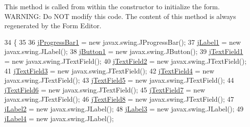 This method is called from within the constructor to initialize the form. W\+A\+R\+N\+I\+NG\+: Do N\+OT modify this code. The content of this method is always regenerated by the Form Editor. 
\begin{DoxyCode}
34                                   \{
35 
36         \mbox{\hyperlink{class_interfaz_package_1_1_alta_diccionario_a708a5b8c6cc94306cd57109ba082a3af}{jProgressBar1}} = \textcolor{keyword}{new} javax.swing.JProgressBar();
37         \mbox{\hyperlink{class_interfaz_package_1_1_alta_diccionario_af8a39de35277501b7801eaf2c5ccbf33}{jLabel1}} = \textcolor{keyword}{new} javax.swing.JLabel();
38         \mbox{\hyperlink{class_interfaz_package_1_1_alta_diccionario_a0f3026ebbc0c7a84616c54c8279221e6}{jButton1}} = \textcolor{keyword}{new} javax.swing.JButton();
39         \mbox{\hyperlink{class_interfaz_package_1_1_alta_diccionario_a36c60a7c341675a6d9588408d4babd4c}{jTextField1}} = \textcolor{keyword}{new} javax.swing.JTextField();
40         \mbox{\hyperlink{class_interfaz_package_1_1_alta_diccionario_ad64c1145064a7b09a9bc29cf43974b70}{jTextField2}} = \textcolor{keyword}{new} javax.swing.JTextField();
41         \mbox{\hyperlink{class_interfaz_package_1_1_alta_diccionario_aae93f196d81a8be5120cd2e4a3968176}{jTextField3}} = \textcolor{keyword}{new} javax.swing.JTextField();
42         \mbox{\hyperlink{class_interfaz_package_1_1_alta_diccionario_a66e68fc19055b7af4fcac12091ab7c45}{jTextField4}} = \textcolor{keyword}{new} javax.swing.JTextField();
43         \mbox{\hyperlink{class_interfaz_package_1_1_alta_diccionario_a56756a5f37a4a3056ce24d5570b99d61}{jTextField5}} = \textcolor{keyword}{new} javax.swing.JTextField();
44         \mbox{\hyperlink{class_interfaz_package_1_1_alta_diccionario_af4d8c6da79f9c1a9c5d4d8b9f70935c0}{jTextField6}} = \textcolor{keyword}{new} javax.swing.JTextField();
45         \mbox{\hyperlink{class_interfaz_package_1_1_alta_diccionario_a21d52c5fe53e1a05874c6771dc828a1d}{jTextField7}} = \textcolor{keyword}{new} javax.swing.JTextField();
46         \mbox{\hyperlink{class_interfaz_package_1_1_alta_diccionario_a3e91b2eb94fa14f68ad137f48e0500f6}{jTextField8}} = \textcolor{keyword}{new} javax.swing.JTextField();
47         \mbox{\hyperlink{class_interfaz_package_1_1_alta_diccionario_ab2913168b8ce8c2e33af1a06a91424a1}{jLabel2}} = \textcolor{keyword}{new} javax.swing.JLabel();
48         \mbox{\hyperlink{class_interfaz_package_1_1_alta_diccionario_a4acae592782e66c775de54bfe425ea0d}{jLabel3}} = \textcolor{keyword}{new} javax.swing.JLabel();
49         \mbox{\hyperlink{class_interfaz_package_1_1_alta_diccionario_ace70621c67ef90297d4ff752d97c97c4}{jLabel4}} = \textcolor{keyword}{new} javax.swing.JLabel();

\end{DoxyCode}
